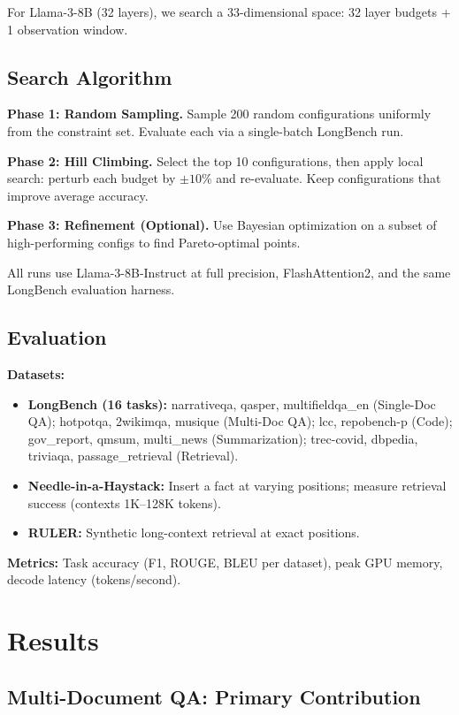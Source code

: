 \documentclass[11pt,a4paper]{article}
\begin{document}
For Llama-3-8B (32 layers), we search a 33-dimensional space: 32 layer budgets + 1 observation window.

\subsection{Search Algorithm}

\textbf{Phase 1: Random Sampling.} Sample 200 random configurations uniformly from the constraint set. Evaluate each via a single-batch LongBench run.

\textbf{Phase 2: Hill Climbing.} Select the top 10 configurations, then apply local search: perturb each budget by $\pm 10\%$ and re-evaluate. Keep configurations that improve average accuracy.

\textbf{Phase 3: Refinement (Optional).} Use Bayesian optimization on a subset of high-performing configs to find Pareto-optimal points.

All runs use Llama-3-8B-Instruct at full precision, FlashAttention2, and the same LongBench evaluation harness.

\subsection{Evaluation}

\textbf{Datasets:}
\begin{itemize}
    \item \textbf{LongBench (16 tasks):} narrativeqa, qasper, multifieldqa\_en (Single-Doc QA); hotpotqa, 2wikimqa, musique (Multi-Doc QA); lcc, repobench-p (Code); gov\_report, qmsum, multi\_news (Summarization); trec-covid, dbpedia, triviaqa, passage\_retrieval (Retrieval).
    \item \textbf{Needle-in-a-Haystack:} Insert a fact at varying positions; measure retrieval success (contexts 1K–128K tokens).
    \item \textbf{RULER:} Synthetic long-context retrieval at exact positions.
\end{itemize}

\textbf{Metrics:} Task accuracy (F1, ROUGE, BLEU per dataset), peak GPU memory, decode latency (tokens/second).

\section{Results}

\subsection{Multi-Document QA: Primary Contribution}
\end{document}
